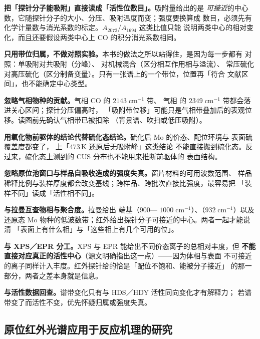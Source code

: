 \begin{pitfall}
\textbf{把「探针分子能吸附」直接读成「活性位数目」。}吸附量给出的是
\emph{可接近}的中心数，它随探针分子的大小、分压、吸附温度而变；强度要换算成
数目，必须先有化学计量数与消光系数的标定。$A_{2072}/A_{1694}$ 这类比值只能
说明两类中心的相对变化，而且还要假设两类中心上 CO 的积分消光系数相同。

\textbf{只用带位归属，不做对照实验。}本书的做法之所以站得住，是因为每一步都有
对照：单吸附对共吸附（分峰）、 对机械混合（区分相互作用相与溢流）、
常压硫化对高压硫化（区分制备变量）。只有一张谱上的一个带位，位置再「符合
文献区间」，也不能确定中心类型。

\textbf{忽略气相物种的贡献。}气相 CO 的 $2143\;\mathrm{cm^{-1}}$ 带、
气相  的 $2349\;\mathrm{cm^{-1}}$ 带都会落进关心区间；探针分压偏高时，
「吸附带位移」可能只是气相带叠加后的表观位移。读图前先确认气相带已被扣除
（背景谱、吹扫或低压吸附）。

\textbf{用氧化物前驱体的结论代替硫化态结论。}硫化后 Mo 的价态、配位环境与
表面硫覆盖度都变了， 上「$473$\,K 还原后无吸附峰」这类结论
不能直接搬到硫化态。反过来，硫化态上测到的 CUS 分布也不能用来推断前驱体的
表面结构。

\textbf{忽略原位池窗口与样品自吸收造成的强度失真。}窗片材料的可用波数范围、
样品稀释比例与装样厚度都会改变基线；跨样品、跨批次直接比强度，最容易把
「装样不同」读成「活性相不同」。
\end{pitfall}

\begin{crosscheck}
\textbf{与拉曼互查物相与聚合度。}拉曼给出  端基（$900$—
$1000\;\mathrm{cm^{-1}}$）、（$932\;\mathrm{cm^{-1}}$）以及还原态
Mo 物种的低波数带；红外给出探针分子可接近的中心。两者一起才能说清
「表面上有什么相」与「这些相上有几个可用的位」。

\textbf{与 XPS／EPR 分工。}XPS 与 EPR 能给出不同价态离子的总相对丰度，但
\textbf{不能直接对应真正的活性中心}（源文明确指出这一点）——因为体相与表面
不可接近的离子同样计入丰度。红外探针给的恰是「配位不饱和、能被分子接近」
的那一部分，两者之差本身就是信息。

\textbf{与活性数据回查。}谱带变化只有与 HDS／HDY 活性同向变化才有解释力；
若谱带变了而活性不变，优先怀疑归属或强度失真。
\end{crosscheck}

\subsection{原位红外光谱应用于反应机理的研究}
\label{sec:ch07c-mech}

